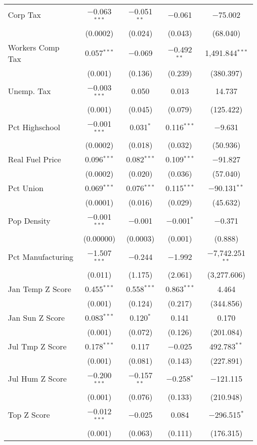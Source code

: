 \begin{table}[!htbp]
\begin{tabular}{@{\extracolsep{5pt}}lcccc}
  Corp Tax & $-$0.063$^{***}$ & $-$0.051$^{**}$ & $-$0.061 & $-$75.002 \\ 
  & (0.0002) & (0.024) & (0.043) & (68.040) \\ 
  Workers Comp Tax & 0.057$^{***}$ & $-$0.069 & $-$0.492$^{**}$ & 1,491.844$^{***}$ \\ 
  & (0.001) & (0.136) & (0.239) & (380.397) \\ 
  Unemp. Tax & $-$0.003$^{***}$ & 0.050 & 0.013 & 14.737 \\ 
  & (0.001) & (0.045) & (0.079) & (125.422) \\ 
  Pct Highschool & $-$0.001$^{***}$ & 0.031$^{*}$ & 0.116$^{***}$ & $-$9.631 \\ 
  & (0.0002) & (0.018) & (0.032) & (50.936) \\ 
  Real Fuel Price & 0.096$^{***}$ & 0.082$^{***}$ & 0.109$^{***}$ & $-$91.827 \\ 
  & (0.0002) & (0.020) & (0.036) & (57.040) \\ 
  Pct Union & 0.069$^{***}$ & 0.076$^{***}$ & 0.115$^{***}$ & $-$90.131$^{**}$ \\ 
  & (0.0001) & (0.016) & (0.029) & (45.632) \\ 
  Pop Density & $-$0.001$^{***}$ & $-$0.001 & $-$0.001$^{*}$ & $-$0.371 \\ 
  & (0.00000) & (0.0003) & (0.001) & (0.888) \\ 
  Pct Manufacturing & $-$1.507$^{***}$ & $-$0.244 & $-$1.992 & $-$7,742.251$^{**}$ \\ 
  & (0.011) & (1.175) & (2.061) & (3,277.606) \\ 
  Jan Temp Z Score & 0.455$^{***}$ & 0.558$^{***}$ & 0.863$^{***}$ & 4.464 \\ 
  & (0.001) & (0.124) & (0.217) & (344.856) \\ 
  Jan Sun Z Score & 0.083$^{***}$ & 0.120$^{*}$ & 0.141 & 0.170 \\ 
  & (0.001) & (0.072) & (0.126) & (201.084) \\ 
  Jul Tmp Z Score & 0.178$^{***}$ & 0.117 & $-$0.025 & 492.783$^{**}$ \\ 
  & (0.001) & (0.081) & (0.143) & (227.891) \\ 
  Jul Hum Z Score & $-$0.200$^{***}$ & $-$0.157$^{**}$ & $-$0.258$^{*}$ & $-$121.115 \\ 
  & (0.001) & (0.076) & (0.133) & (210.948) \\ 
  Top Z Score & $-$0.012$^{***}$ & $-$0.025 & 0.084 & $-$296.515$^{*}$ \\ 
  & (0.001) & (0.063) & (0.111) & (176.315) \\ 

\end{tabular}
\end{table}
